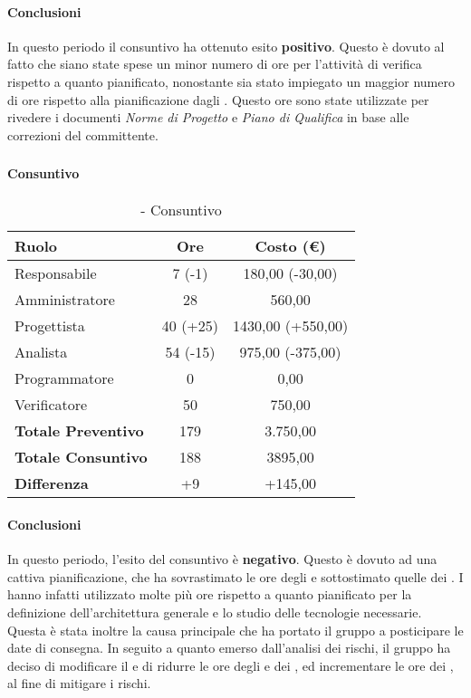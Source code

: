\documentclass[./PianoDiProgetto.tex]{subfiles}
\begin{document}
	\paragraph{Conclusioni}
	In questo periodo il consuntivo ha ottenuto esito \textbf{positivo}. Questo è dovuto al fatto che siano state spese un minor numero di ore  per l'attività di verifica rispetto a quanto pianificato, nonostante sia stato impiegato un maggior numero di ore rispetto alla pianificazione dagli \AMMP{}. Questo ore sono state utilizzate per rivedere i documenti \textit{Norme di Progetto} e \textit{Piano di Qualifica} in base alle correzioni del committente.

\subsubsection{\PerPA}
\paragraph{Consuntivo}
	\begin{table}[h]
		\centering
		\begin{tabular}{l * {2}{c}}
			\toprule
			\textbf{Ruolo} & \textbf{Ore} & \textbf{Costo (\euro{})} \\
			\midrule
			Responsabile &	7 (-1) & 180,00 (-30,00) \\
			Amministratore & 28 & 560,00\\
			Progettista & 40 (+25) & 1430,00 (+550,00)\\
			Analista & 54 (-15)  & 975,00 (-375,00)\\
			Programmatore & 0 & 0,00 \\
			Verificatore & 50 & 750,00\\
			\midrule
			\textbf{Totale Preventivo} & 179
 & 3.750,00
 \\
			\textbf{Totale Consuntivo} & 188 & 3895,00
 \\
			\midrule
			\textbf{Differenza} & +9 & +145,00 \\
			\bottomrule
		\end{tabular}
		\caption{\PerPA{} - Consuntivo}
	\end{table}
	\paragraph{Conclusioni}
			In questo periodo, l'esito del consuntivo è \textbf{negativo}. Questo è dovuto ad una cattiva pianificazione, che ha sovrastimato le ore degli \ANP{} e sottostimato quelle dei \PJP{}. I \PJP{} hanno infatti utilizzato molte più ore rispetto a quanto pianificato per la definizione dell'architettura generale e lo studio delle tecnologie necessarie. Questa è stata inoltre la causa principale che ha portato il gruppo a posticipare le date di consegna. In seguito a quanto emerso dall'analisi dei rischi, il gruppo ha deciso di modificare il \PPdoc{} e di ridurre le ore degli \ANP{} e dei \VERP{}, ed incrementare le ore dei \PJP, al fine di mitigare i rischi.
\end{document}
